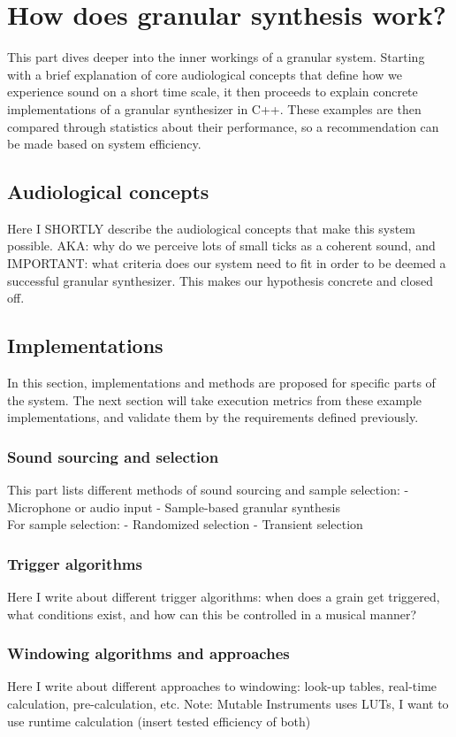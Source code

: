 \documentclass[10pt, twocolumn]{IEEEtran}
\begin{document}
\section{How does granular synthesis work?}
This part dives deeper into the inner workings of a granular system. Starting with a brief explanation of core audiological concepts that define how we experience sound on a short time scale, it then proceeds to explain concrete implementations of a granular synthesizer in C++. These examples are then compared through statistics about their performance, so a recommendation can be made based on system efficiency.

\subsection{Audiological concepts}
Here I SHORTLY describe the audiological concepts that make this system possible. AKA: why do we perceive lots of small ticks as a coherent sound, and IMPORTANT: what criteria does our system need to fit in order to be deemed a successful granular synthesizer. This makes our hypothesis concrete and closed off.

\subsection{Implementations}
In this section, implementations and methods are proposed for specific parts of the system. The next section will take execution metrics from these example implementations, and validate them by the requirements defined previously.

\subsubsection{Sound sourcing and selection}
This part lists different methods of sound sourcing and sample selection:
- Microphone or audio input
- Sample-based granular synthesis\\
For sample selection:
- Randomized selection
- Transient selection
\subsubsection{Trigger algorithms}
Here I write about different trigger algorithms: when does a grain get triggered, what conditions exist, and how can this be controlled in a musical manner?
\subsubsection{Windowing algorithms and approaches}
Here I write about different approaches to windowing: look-up tables, real-time calculation, pre-calculation, etc.
Note: Mutable Instruments uses LUTs, I want to use runtime calculation (insert tested efficiency of both)
\end{document}
